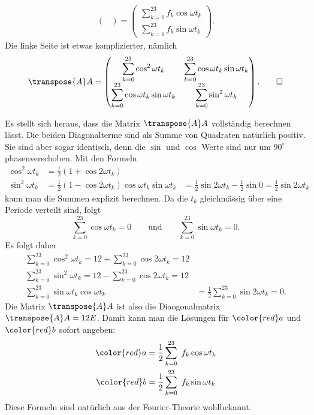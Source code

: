 \begin{loesung}
\begin{align*}
\begin{pmatrix}
\end{pmatrix}
=
\begin{pmatrix}
\displaystyle\sum_{k=0}^{23} f_k\cos\omega t_k\\
\displaystyle\sum_{k=0}^{23} f_k\sin\omega t_k
\end{pmatrix}.
\end{align*}
Die linke Seite ist etwas komplizierter, nämlich
\[
\transpose{A}A
=
\begin{pmatrix}
\displaystyle \sum_{k=0}^{23} \cos^2\omega t_k
&
\displaystyle \sum_{k=0}^{23} \cos\omega t_k\sin\omega t_k
\\
\displaystyle \sum_{k=0}^{23} \cos\omega t_k\sin\omega t_k
&
\displaystyle \sum_{k=0}^{23} \sin^2\omega t_k
\end{pmatrix}.
\qedhere
\]
\end{loesung}

\begin{diskussion}
Es stellt sich heraus, dass die Matrix $\transpose{A}A$ vollständig berechnen lässt.
Die beiden Diagonalterme sind als Summe von Quadraten natürlich positiv.
Sie sind aber sogar identisch, denn die $\sin$ und $\cos$ Werte
sind nur um $90^\circ$ phasenverschoben.
Mit den Formeln
\begin{align*}
\cos^2\omega t_k
&=
\frac12(1+\cos2\omega t_k)
\\
\sin^2\omega t_k
&=
\frac12(1-\cos 2\omega t_k)
\cos\omega t_k \sin\omega t_k
&=
\frac12\sin2\omega t_k
-
\frac12\sin 0
=
\frac12\sin2\omega t_k
\end{align*}
kann man die Summen explizit berechnen.
Da die $t_k$ gleichmässig über eine Periode verteilt sind, folgt
\[
\sum_{k=0}^23 \cos\omega t_k = 0
\qquad\text{und}\qquad
\sum_{k=0}^23 \sin\omega t_k = 0.
\]
Es folgt daher
\begin{align*}
\sum_{k=0}^{23}
\cos^2\omega t_k
=
12 + \sum_{k=0}^{23}\cos2\omega t_k = 12
\\
\sum_{k=0}^{23}
\sin^2\omega t_k
=
12 - \sum_{k=0}^{23}\cos2\omega t_k = 12
\\
\sum_{k=0}^{23}
\sin\omega t_k\cos\omega t_k
&=
\frac12\sum_{k=0}^{23} \sin 2\omega t_k
= 0.
\end{align*}
Die Matrix $\transpose{A}A$ ist also die Diaogonalmatrix $\transpose{A}A=12E$.
Damit kann man die Lösungen für ${\color{red}a}$ und ${\color{red}b}$
sofort angeben:
\begin{align*}
{\color{red}a}
&= 
\frac12\sum_{k=0}^{23} f_k \cos\omega t_k
\\
{\color{red}b}
&= 
\frac12\sum_{k=0}^{23} f_k \sin\omega t_k
\end{align*}
Diese Formeln sind natürlich aus der Fourier-Theorie wohlbekannt.
\end{diskussion}

